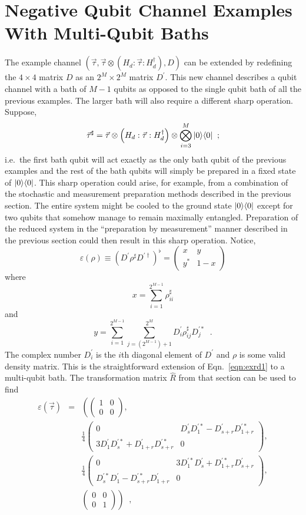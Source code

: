 \chapter{Negative Qubit Channel Examples With Multi-Qubit Baths}
\label{sec:multibath}

The example channel $(\vec{\tau},\vec{\tau}\otimes \left( H_d:\vec{\tau}:H_d^\dagger\right),D)$ can be extended by redefining the $4\times4$ matrix $D$ as an $2^M\times 2^M$ matrix $D^\prime$.  This new channel describes a qubit channel with a bath of $M-1$ qubits as opposed to the single qubit bath of all the previous examples.  The larger bath will also require a different sharp operation.  Suppose,
$$
\vec{\tau}^\sharp = \vec{\tau}\otimes\left(H_d:\vec{\tau}:H_d^\dagger\right)\otimes\bigotimes_{i=3}^{M}|0\rangle\langle0|\;\;;
$$
i.e.\ the first bath qubit will act exactly as the only bath qubit of the previous examples and the rest of the bath qubits will simply be prepared in a fixed state of $|0\rangle\langle0|$.  This sharp operation could arise, for example, from a combination of the stochastic and measurement preparation methods described in the previous section.  The entire system might be cooled to the ground state $|0\rangle\langle0|$ except for two qubits that somehow manage to remain maximally entangled.  Preparation of the reduced system in the ``preparation by measurement'' manner described in the previous section could then result in this sharp operation.  Notice,
$$
\varepsilon(\rho) \equiv \left(D^\prime \rho^\sharp D^{\prime\dagger}\right)^\flat = \begin{pmatrix}x&y\\y^*&1-x\end{pmatrix}
$$
where
$$
x = \sum_{i=1}^{2^{M-1}} \rho^\sharp_{ii}
$$
and
$$
y = \sum_{i=1}^{2^{M-1}} \sum_{j=(2^{M-1})+1}^{2^M} D^\prime_{i} \rho^\sharp_{ij} D^{\prime *}_j\;\;.
$$
The complex number $D^\prime_i$ is the $i$th diagonal element of $D^\prime$ and $\rho$ is some valid density matrix.  This is the straightforward extension of Eqn.\ \ref{eqn:exrd1} to a multi-qubit bath.  The transformation matrix $\hat{R}$ from that section can be used to find    
\begin{eqnarray*}
\varepsilon(\vec{\tau}) &=& \left(\begin{pmatrix}
1&0\\0&0
\end{pmatrix},\right.\\
& &\frac{1}{4}\begin{pmatrix}
0&D^\prime_s D^{\prime *}_1-D^\prime_{s+r}D^{\prime *}_{1+r}\\
3D^\prime_1 D^{\prime *}_s+D^\prime_{1+r}D^{\prime *}_{s+r}&0
\end{pmatrix},\\
& &\frac{1}{4}\begin{pmatrix}
0&3D^{\prime *}_1 D^{\prime}_s+D^{\prime *}_{1+r}D^{\prime}_{s+r} \\
D^{\prime *}_s D^{\prime}_1-D^{\prime *}_{s+r}D^{\prime}_{1+r}&0
\end{pmatrix},\\
& &\left.\begin{pmatrix}
0&0\\
0&1
\end{pmatrix}\right)\;\;,
\end{eqnarray*}
